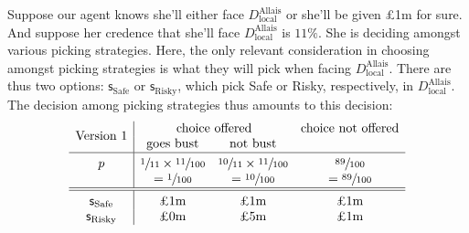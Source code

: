 \documentclass[a4paper,final]{article}
\newcommand\Tstrut{\rule{0pt}{2.6ex}}       %
\newcommand\Bstrut{\rule[-0.9ex]{0pt}{0pt}} %
\newcommand\s{\mathsf{s}}
\newenvironment{CCM rewritten}
{\begingroup\color{blue}} %
{\endgroup}              %
\begin{document}
Suppose our agent knows she'll either face $D^{\mathrm{Allais}}_{\mathrm{local}}$ or she'll be given \pounds1m for sure. And suppose her credence that she'll face $D^{\mathrm{Allais}}_{\mathrm{local}}$ is $11\%$. She is deciding amongst various picking strategies. 
Here, the only relevant consideration in choosing amongst picking strategies is what they will pick when facing $D^{\mathrm{Allais}}_{\mathrm{local}}$. There are thus two options: $\s_{\mathrm{Safe}}$ or $\s_{\mathrm{Risky}}$, which pick Safe or Risky, respectively, in $D^{\mathrm{Allais}}_{\mathrm{local}}$. 
The decision among picking strategies thus amounts to this decision:
%
%
	$$
\begin{array}{c|ccc}
	\multirow{2}{*}{\text{Version 1}}	&\multicolumn{2}{c}{\text{choice offered}}&\text{choice not offered}\\
	& \text{goes bust} &  \text{not bust}  \Bstrut\\\hline\Tstrut	
	p &  \sfrac{1}{11} \times \sfrac{11}{100} & \sfrac{10}{11}\times\sfrac{11}{100} & \sfrac{89}{100} \\
	& = \sfrac{1}{100} & = \sfrac{10}{100} & = \sfrac{89}{100}
		\Bstrut\\\hline\hline\Tstrut	
	\s_{\mathrm{Safe}} & \text{\pounds 1m}&\text{\pounds 1m}         &\text{\pounds 1m}               \\
	\s_{\mathrm{Risky}}& \text{\pounds 0m}&\text{\pounds 5m}& \text{\pounds 1m}
\end{array}
$$
\end{document}

